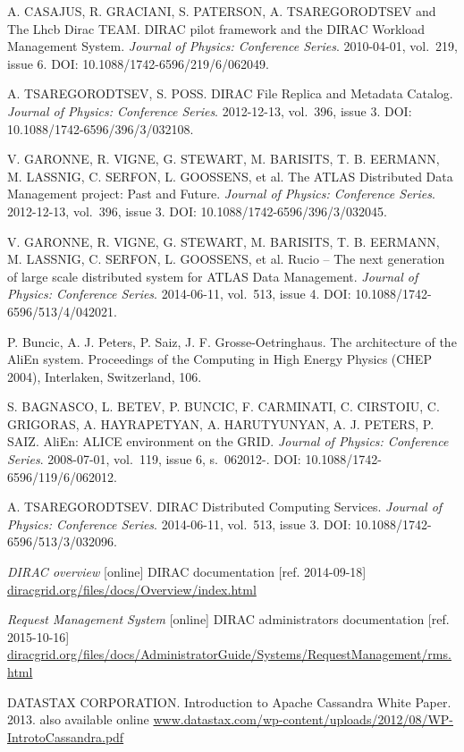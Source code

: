 \begin{thebibliography}{99}
	A. CASAJUS, R. GRACIANI, S. PATERSON, A. TSAREGORODTSEV and The Lhcb Dirac TEAM. 
	DIRAC pilot framework and the DIRAC Workload Management System. 
	\textit{Journal of Physics: Conference Series}. 2010-04-01, vol.~219, issue 6. 
	DOI: 10.1088/1742-6596/219/6/062049. 
	
	A. TSAREGORODTSEV, S. POSS. 
	DIRAC File Replica and Metadata Catalog. 
	\textit{Journal of Physics: Conference Series}. 2012-12-13, vol.~396, issue 3. 
	DOI: 10.1088/1742-6596/396/3/032108. 
	
	V. GARONNE, R. VIGNE, G. STEWART, M. BARISITS, T. B. EERMANN, M. LASSNIG, C. SERFON, L. GOOSSENS, et al. 
	The ATLAS Distributed Data Management project: Past and Future. 
	\textit{Journal of Physics: Conference Series}. 2012-12-13, vol.~396, issue 3.
	DOI: 10.1088/1742-6596/396/3/032045. 
	
	V. GARONNE, R. VIGNE, G. STEWART, M. BARISITS, T. B. EERMANN, M. LASSNIG, C. SERFON, L. GOOSSENS, et al. 
	Rucio – The next generation of large scale distributed system for ATLAS Data Management. 
	\textit{Journal of Physics: Conference Series}. 2014-06-11, vol.~513, issue 4.
	DOI: 10.1088/1742-6596/513/4/042021.
	
	P. Buncic, A. J. Peters, P. Saiz, J. F. Grosse-Oetringhaus. 
	The architecture of the AliEn system. Proceedings of the Computing in High Energy Physics (CHEP 2004), 				
	Interlaken, Switzerland, 106.
	
	S. BAGNASCO, L. BETEV, P. BUNCIC, F. CARMINATI, C. CIRSTOIU, C. GRIGORAS, A. HAYRAPETYAN, A. HARUTYUNYAN, 
	A. J. PETERS, P. SAIZ. 
	AliEn: ALICE environment on the GRID. 
	\textit{Journal of Physics: Conference Series}. 2008-07-01, vol.~119, issue 6, s.~062012-. 
	DOI: 10.1088/1742-6596/119/6/062012.
	
	A. TSAREGORODTSEV.
	DIRAC Distributed Computing Services. 
	\textit{Journal of Physics: Conference Series}. 2014-06-11, vol.~513, issue 3. 
	DOI: 10.1088/1742-6596/513/3/032096. 

	\emph{DIRAC overview} [online] 
	DIRAC documentation [ref. 2014-09-18]
	\url{diracgrid.org/files/docs/Overview/index.html}
	
	\emph{Request Management System} [online] 
	DIRAC administrators documentation [ref. 2015-10-16]
	\url{diracgrid.org/files/docs/AdministratorGuide/Systems/RequestManagement/rms.html}
	
	DATASTAX CORPORATION. Introduction to Apache Cassandra White Paper. 2013.
	also available online \url{www.datastax.com/wp-content/uploads/2012/08/WP-IntrotoCassandra.pdf}
	

\end{thebibliography}
